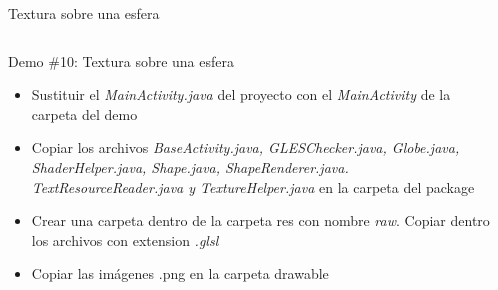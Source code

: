 \documentclass[aspectratio=169,compress]{beamer}
\begin{document}
\begin{frame}{Textura sobre una esfera}
\begin{columns}
\begin{column}{0.7\textwidth}
\begin{block}{Demo \#10: Textura sobre una esfera}
\begin{itemize}
\item Sustituir el \textit{MainActivity.java} del proyecto con el \textit{MainActivity} de la carpeta del demo
\item Copiar los archivos \textit{BaseActivity.java, GLESChecker.java, Globe.java, ShaderHelper.java, Shape.java, ShapeRenderer.java. TextResourceReader.java y TextureHelper.java} en la carpeta del package
\item Crear una carpeta dentro de la carpeta res con nombre \textit{raw}. Copiar dentro los archivos con extension \textit{.glsl}
\item Copiar las imágenes .png en la carpeta drawable 
\end{itemize}
\end{block}
\end{column}
\begin{column}{0.3\textwidth}
\begin{center}

\end{center}
\end{column}
\end{columns}
\end{frame}
\end{document}
